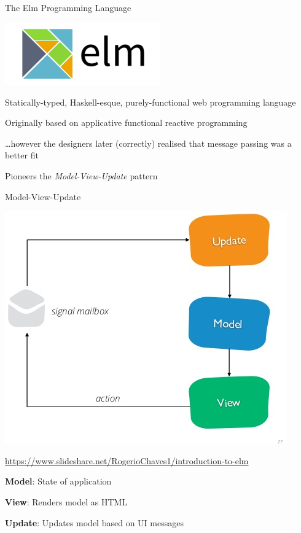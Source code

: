 \documentclass[11.5pt, aspectratio=169]{beamer}
\begin{document}
\begin{frame}{The Elm Programming Language}

  \begin{center}
    \includegraphics[width=0.5\textwidth]{images/ElmLogo.png}
  \end{center}

  \begin{fullpageitemize}
  \item Statically-typed, Haskell-esque, purely-functional web programming language
  \item Originally based on applicative functional reactive programming
    \begin{itemize}
      \itemR \ldots however the designers later (correctly) realised that message passing was a better fit
    \end{itemize}
    \item Pioneers the \emph{Model-View-Update} pattern
  \end{fullpageitemize}
\end{frame}

\begin{frame}{Model-View-Update}

  \begin{center}
    \includegraphics[scale=1.3]{images/mvu.png}

    \hfill {\tiny \url{https://www.slideshare.net/RogerioChaves1/introduction-to-elm}}
  \end{center}

  \begin{fullpageitemize}
  \item {\Large \textbf{Model}: State of application}
  \item {\Large \textbf{View}: Renders model as HTML}
  \item {\Large \textbf{Update}: Updates model based on UI messages}
  \end{fullpageitemize}

\end{frame}
\end{document}
